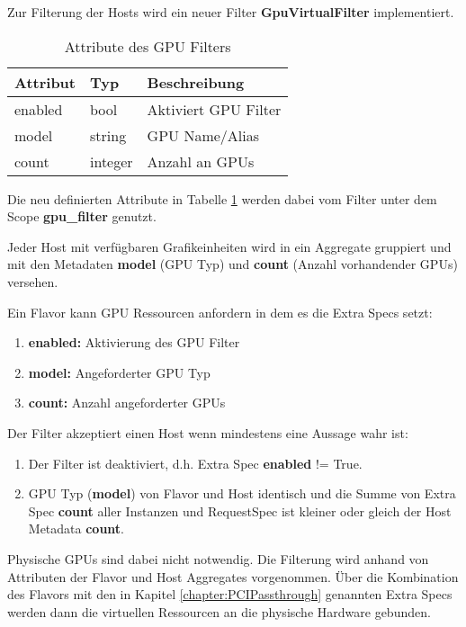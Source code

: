 \documentclass[../Main.tex]{subfiles}
\begin{document}
Zur Filterung der Hosts wird ein neuer Filter \textbf{GpuVirtualFilter} implementiert.

\begin{table}[H]
    \centering
    \caption{Attribute des GPU Filters}
    \renewcommand{\arraystretch}{1.2}
    \begin{tabular}{lll}
        \hline
        \textbf{Attribut} & \textbf{Typ} & \textbf{Beschreibung} \\ 
        \hline
        enabled & bool & Aktiviert GPU Filter \\ 
        model & string & GPU Name/Alias \\ 
        count & integer & Anzahl an GPUs \\ 
        \hline
    \end{tabular}
    \label{table:FilterAttributes}
\end{table}

Die neu definierten Attribute in Tabelle \ref{table:FilterAttributes} werden dabei vom Filter unter dem Scope \textbf{gpu\_filter} genutzt.

Jeder Host mit verfügbaren Grafikeinheiten wird in ein Aggregate gruppiert und mit den Metadaten \textbf{model} (GPU Typ) und \textbf{count} (Anzahl vorhandender GPUs) versehen.

Ein Flavor kann GPU Ressourcen anfordern in dem es die Extra Specs setzt:

\begin{enumerate}
    \item \textbf{enabled:} Aktivierung des GPU Filter
    \item \textbf{model:} Angeforderter GPU Typ
    \item \textbf{count:} Anzahl angeforderter GPUs
\end{enumerate}

Der Filter akzeptiert einen Host wenn mindestens eine Aussage wahr ist:

\begin{enumerate}
    \item Der Filter ist deaktiviert, d.h. Extra Spec \textbf{enabled} != True.
    \item GPU Typ (\textbf{model}) von Flavor und Host identisch und
    die Summe von Extra Spec \textbf{count} aller Instanzen und RequestSpec ist kleiner oder gleich der Host Metadata \textbf{count}.
\end{enumerate}

Physische GPUs sind dabei nicht notwendig. Die Filterung wird anhand von Attributen der Flavor und Host Aggregates vorgenommen.
Über die Kombination des Flavors mit den in Kapitel \ref{chapter:PCIPassthrough} genannten Extra Specs werden dann die virtuellen Ressourcen
an die physische Hardware gebunden.
\end{document}
